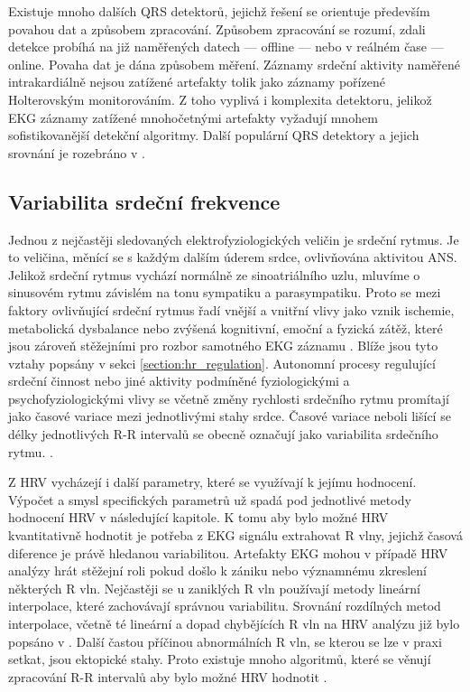 Existuje mnoho dalších QRS detektorů, jejichž řešení se orientuje především
povahou dat a způsobem zpracování. Způsobem zpracování se rozumí, zdali detekce
probíhá na již naměřených datech --- offline --- nebo v reálném čase --- online.
Povaha dat je dána způsobem měření. Záznamy srdeční aktivity naměřené
intrakardiálně nejsou zatížené artefakty tolik jako záznamy pořízené
Holterovským monitorováním. Z toho vyplivá i komplexita detektoru, jelikož EKG
záznamy zatížené mnohočetnými artefakty vyžadují mnohem sofistikovanější
detekční algoritmy. Další populární QRS detektory a jejich srovnání je rozebráno
v \cite{Kohler2002,Canento2012,Vaneghi2012,Alvarez2013,Karpagachelvi2010}.


\subsection{Variabilita srdeční frekvence}
\label{section:hrv}
Jednou z nejčastěji sledovaných elektrofyziologických veličin je srdeční rytmus.
Je to veličina, měnící se s každým dalším úderem srdce, ovlivňována aktivitou
ANS. Jelikož srdeční rytmus vychází normálně ze sinoatriálního uzlu, mluvíme o
sinusovém rytmu závislém na tonu sympatiku a parasympatiku. Proto se mezi
faktory ovlivňující srdeční rytmus řadí vnější a vnitřní vlivy jako vznik
ischemie, metabolická dysbalance nebo zvýšená kognitivní, emoční a fyzická
zátěž, které jsou zároveň stěžejními pro rozbor samotného EKG záznamu
\cite{Pumprla2014}. Blíže jsou tyto vztahy popsány v sekci
\ref{section:hr_regulation}. Autonomní procesy regulující srdeční činnost nebo
jiné aktivity podmíněné fyziologickými a psychofyziologickými vlivy se včetně
změny rychlosti srdečního rytmu promítají jako časové variace mezi jednotlivými
stahy srdce. Časové variace neboli lišící se délky jednotlivých R-R intervalů se
obecně označují jako variabilita srdečního rytmu.
\cite{Pumprla2014,Rajendra2007}.

Z HRV vycházejí i další parametry, které se využívají k jejímu hodnocení.
Výpočet a smysl specifických parametrů už spadá pod jednotlivé metody hodnocení
HRV v následující kapitole. K tomu aby bylo možné HRV kvantitativně hodnotit je
potřeba z EKG signálu extrahovat R vlny, jejichž časová diference je právě
hledanou variabilitou. Artefakty EKG mohou v případě HRV analýzy hrát stěžejní
roli pokud došlo k zániku nebo významnému zkreslení některých R vln. Nejčastěji
se u zaniklých R vln používají metody lineární interpolace, které zachovávají
správnou variabilitu. Srovnání rozdílných metod interpolace, včetně té lineární
a dopad chybějících R vln na HRV analýzu již bylo popsáno v
\cite{Kim2007,Peltola2012,Morelli2019}. Další častou příčinou abnormálních R
vln, se kterou se lze v praxi setkat, jsou ektopické stahy. Proto existuje mnoho
algoritmů, které se věnují zpracování R-R intervalů aby bylo možné HRV hodnotit
\cite{Lipponen2019}.

